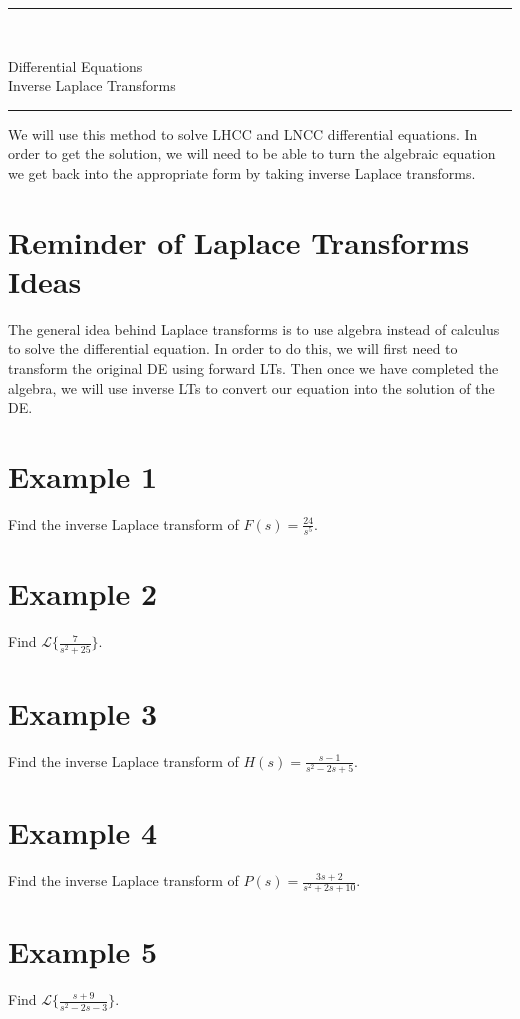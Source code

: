 \documentclass[12pt]{article}
\newcommand{\<}{\langle}
\renewcommand{\>}{\rangle}
\begin{document}
\noindent\rule{7in}{0.4pt}\\
\begin{center}
{\sc Differential Equations\\
Inverse Laplace Transforms}
\end{center}
\noindent\rule{7in}{0.4pt}

\noindent  We will use this method to solve LHCC and LNCC differential equations.   In order to get the solution, we will need to be able to turn the algebraic equation we get back into the appropriate form by taking inverse Laplace transforms.
 

\section*{Reminder of Laplace Transforms Ideas}

\noindent The general idea behind Laplace transforms is to use algebra instead of calculus to solve the differential equation.  In order to do this, we will first need to transform the original DE using forward LTs.  Then once we have completed the algebra, we will use inverse LTs to convert our equation into the solution of the DE.

\vspace{2in}

 
\section*{Example 1}
\noindent Find the inverse Laplace transform of $\displaystyle{ F(s) = \frac{24}{s^5}}$. 

\newpage

\section*{Example 2}
\noindent Find $\displaystyle{ \mathscr{L} \{ \frac{7}{s^2+25} \}}$. 
\vfill

\section*{Example 3}
\noindent Find the inverse Laplace transform of $\displaystyle{H(s) = \frac{s-1}{s^2-2s+5}}$. 
\vfill
\newpage

\section*{Example 4}
\noindent Find the inverse Laplace transform of $\displaystyle{P(s) = \frac{3s+2}{s^2+2s+10}}$.
\newpage

\section*{Example 5}
\noindent Find $\displaystyle{\mathscr{L} \{ \frac{s+9}{s^2-2s-3} \}}$. 
\newpage

\phantom{a}
\newpage


\end{document}
